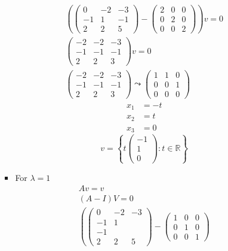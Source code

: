 \begin{enumerate}
\begin{enumerate}[(i)]
\begin{itemize}
\begin{gather}
\left(\begin{pmatrix}
0 & -2 & -3\\
-1 & 1 & -1\\
2 & 2 & 5
\end{pmatrix}
-
\begin{pmatrix}
2 & 0 & 0\\
0 & 2 & 0\\
0 & 0 & 2
\end{pmatrix}
\right)v = 0\\
\begin{pmatrix}
-2 & -2 &   -3\\
-1 & -1 & -1\\
2 & 2 & 3
\end{pmatrix}
v=0\\
\begin{pmatrix}
-2 & -2 &   -3\\
-1 & -1 & -1\\
2 & 2 & 3
\end{pmatrix}
\leadsto
\begin{pmatrix}
1 & 1 & 0\\
0 & 0 & 1\\
0 & 0 & 0
\end{pmatrix}
\end{gather}
\begin{align}
x_1 &= -t \\
x_2 &= t\\
x_3 &= 0
\end{align}
\begin{equation}
v= \left\{t\begin{pmatrix}-1\\1\\0\end{pmatrix}\colon t \in \mathbb{R}\right\}
\end{equation}
\item For $\lambda=1$
\begin{gather}
Av = v\\
(A-I)V = 0\\
\left(
\begin{pmatrix}
0 & -2  & -3\\
-1 & 1 \\ -1\\
2 & 2 & 5
\end{pmatrix}
-
\begin{pmatrix}
1 & 0 & 0\\
0 & 1 & 0\\
0 & 0 & 1
\end{pmatrix}

\end{gather}
\end{itemize}
\end{enumerate}
\end{enumerate}

